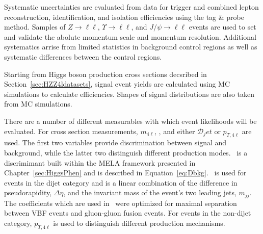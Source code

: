 Systematic uncertainties are evaluated from data for trigger 
and combined lepton reconstruction, identification, and
isolation efficiencies using the tag \& probe method.  
Samples of $Z\to\ell\ell$, 
$\Upsilon\to\ell\ell$, and $J/\psi\to\ell\ell$ events are used
to set and validate the abolute momentum scale and momentum
resolution.  
Additional systematics arrise from limited statistics in 
background control regions as well as systematic differences 
between the control regions.  


Starting from Higgs boson production cross sections decsribed in 
Section~\ref{sec:HZZ4ldatasets}, signal event yields are calculated
using MC simulations to calculate efficiencies.   Shapes of 
signal distributions are also taken from MC simulations.  

There are a number of different measurables with which event 
likelihoods will be evaluated.  For cross section measurements,
$m_{4\ell}$, \KD, and either $\mathscr{D}_jet$ or $p_{T,4\ell}$ 
are used.  The first two
variables provide discrimination between signal and background,
while the latter two distinguish different production modes.
\KD~is a discrimimant built within the MELA framework presented 
in Chapter~\ref{sec:HiggsPhen} and is described in 
Equation~\ref{eq:Dbkg}.
\Djet~is used for events in the dijet category and is a linear 
combination of the difference in pseudorapidity,
$\Delta\eta$, and the invariant mass of the event's two leading 
jets, $m_{jj}$.  The coefficients which are used in \Djet~were 
optimized 
for maximal separation between VBF events and gluon-gluon fusion
events.  For events in the non-dijet category, $p_{T,4\ell}$ is used
to distinguish different production mechanisms.  

